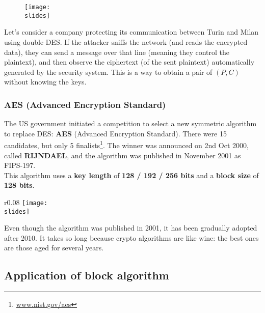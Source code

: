 \begin{figure}[h]
    \centering
    \texttt{[image: \\slides]}
\end{figure}

Let's consider a company protecting its communication between Turin and Milan using double DES. If the attacker sniffs the network (and reads the encrypted data), they can send a message over that line (meaning they control the plaintext), and then observe the ciphertext (of the sent plaintext) automatically generated by the security system.
This is a way to obtain a pair of \((P, C)\) without knowing the keys.

\subsubsection{AES (Advanced Encryption Standard)}
The US government initiated a competition to select a new symmetric algorithm to replace DES: \textbf{AES} (Advanced Encryption Standard). There were 15 candidates, but only 5 finalists\footnote{\url{www.nist.gov/aes}}. The winner was announced on 2nd Oct 2000, called \textbf{RIJNDAEL}, and the algorithm was published in November 2001 as FIPS-197.\\
This algorithm uses a \textbf{key length} of \textbf{128 / 192 / 256 bits} and a \textbf{block size} of \textbf{128 bits}.

\begin{wrapfigure}{r}{0.08\textwidth}
    \centering
    \texttt{[image: \\slides]}
\end{wrapfigure}

Even though the algorithm was published in 2001, it has been gradually adopted after 2010. It takes so long because crypto algorithms are like wine: the best ones are those aged for several years.


\newpage
\subsection{Application of block algorithm}

